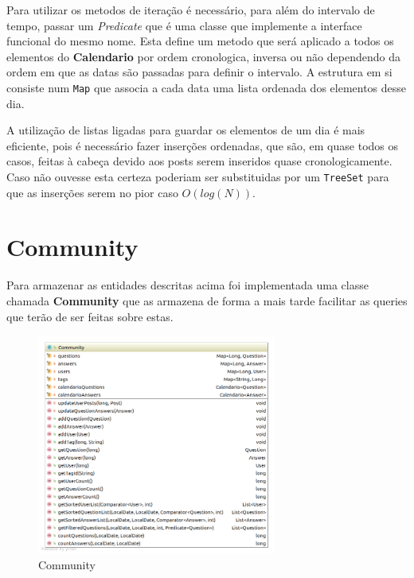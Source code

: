 \documentclass[10pt,a4paper]{report}
\begin{document}
        Para utilizar os metodos de iteração é necessário, para além do
        intervalo de tempo, passar um \textit{Predicate} que é uma classe que
        implemente a interface funcional do mesmo nome. Esta define um metodo
        que será aplicado a todos os elementos do \textbf{Calendario} por ordem
        cronologica, inversa ou não dependendo da ordem em que as datas são
        passadas para definir o intervalo.
        A estrutura em si consiste num \texttt{Map} que associa a cada
        data uma lista ordenada dos elementos desse dia.

        A utilização de listas ligadas para guardar os elementos de um dia é
        mais eficiente, pois é necessário fazer inserções ordenadas, que são, em
        quase todos os casos, feitas à cabeça devido aos posts serem inseridos
        quase cronologicamente. Caso não ouvesse esta certeza poderiam ser
        substituidas por um \texttt{TreeSet} para que as inserções
        serem no pior caso $O(log(N))$.

    \section{Community}
    Para armazenar as entidades descritas acima foi implementada uma classe
    chamada \textbf{Community} que as armazena de forma a mais tarde facilitar
    as queries que terão de ser feitas sobre estas.

    \begin{figure}[H]
        \centering
        \includegraphics[width=0.7\textwidth]{./images/Community.png}
        \caption{Community}
    \end{figure}
\end{document}
